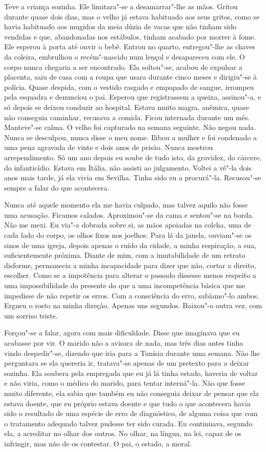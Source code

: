 Teve a criança sozinha. Ele limitara"-se a desamarrar"-lhe as mãos.
Gritou durante quase dois dias, mas o velho já estava habituado aos seus
gritos, como se havia habituado aos mugidos da meia dúzia de vacas que
não tinham sido vendidas e que, abandonadas nos estábulos, tinham
acabado por morrer à fome. Ele esperou à porta até ouvir o bebê. Entrou
no quarto, entregou"-lhe as chaves da coleira, embrulhou o
recém"-nascido num lençol e desapareceu com ele. O corpo nunca chegaria
a ser encontrado. Ela soltou"-se, acabou de expulsar a placenta, saiu de
casa com a roupa que usara durante cinco meses e dirigiu"-se à polícia.
Quase despida, com o vestido rasgado e empapado de sangue, irrompeu pela
esquadra e denunciou o pai. Esperou que registrassem a queixa,
assinou"-a, e só depois se deixou conduzir ao hospital. Estava muito
magra, anêmica, quase não conseguia caminhar, recusava a comida. Ficou
internada durante um mês. Manteve"-se calma. O velho foi capturado na
semana seguinte. Não negou nada. Nunca se desculpou, nunca disse o meu
nome. Ilibou a mulher e foi condenado a uma pena agravada de vinte e
dois anos de prisão. Nunca mostrou arrependimento. Só um ano depois eu
soube de tudo isto, da gravidez, do cárcere, do infanticídio. Estava em
Itália, não assisti ao julgamento. Voltei a vê"-la dois anos mais tarde,
já ela vivia em Sevilha. Tinha sido eu a procurá"-la. Recusou"-se sempre
a falar do que acontecera.

Nunca até aquele momento ela me havia culpado, mas talvez aquilo não
fosse uma acusação. Ficamos calados. Aproximou"-se da cama e sentou"-se
na borda. Não me mexi. Eu via"-a dobrada sobre si, as mãos apoiadas na
colcha, uma de cada lado do corpo, os olhos fixos nos joelhos. Para lá
da janela, ouviam"-se os sinos de uma igreja, depois apenas o ruído da
cidade, a minha respiração, a sua, suficientemente próxima. Diante de
mim, com a imutabilidade de um retrato disforme, permanecia a minha
incapacidade para dizer que não, cortar a direito, escolher. Como se a
impotência para alterar o passado dissesse menos respeito a uma
impossibilidade do presente do que a uma incompetência básica que me
impedisse de não repetir os erros. Com a consciência do erro,
sabíamo"-lo ambos. Ergueu o rosto na minha direção. Apenas uns
segundos. Baixou"-o outra vez, com um sorriso triste.

Forçou"-se a falar, agora com mais dificuldade. Disse que imaginava que
eu acabasse por vir. O marido não a avisara de nada, mas três dias antes
tinha vindo despedir"-se, dizendo que iria para a Tunísia durante uma
semana. Não lhe perguntara se ela quereria ir, tratava"-se apenas de um
pretexto para a deixar sozinha. Ela soubera pela empregada que eu já lá
tinha estado, haveria de voltar e não viria, como o médico do marido,
para tentar interná"-la. Não que fosse muito diferente, ela sabia que
também eu não conseguia deixar de pensar que ela estava doente, que eu
próprio estava doente e que tudo o que acontecera havia sido o resultado
de uma espécie de erro de diagnóstico, de alguma coisa que com o
tratamento adequado talvez pudesse ter sido curada. Eu continuava,
segundo ela, a acreditar no olhar dos outros. No olhar, na língua, na
lei, capaz de os infringir, mas não de os contestar. O pai, o estado, a
moral.


